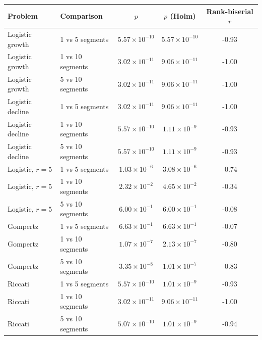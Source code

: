 \begin{tabular}{llccc}
\toprule
Problem & Comparison & $p$ & $p$ (Holm) & Rank-biserial $r$\\
\midrule
Logistic growth & 1 vs 5 segments & $5.57\times10^{-10}$ & $5.57\times10^{-10}$ & -0.93\\
Logistic growth & 1 vs 10 segments & $3.02\times10^{-11}$ & $9.06\times10^{-11}$ & -1.00\\
Logistic growth & 5 vs 10 segments & $3.02\times10^{-11}$ & $9.06\times10^{-11}$ & -1.00\\
Logistic decline & 1 vs 5 segments & $3.02\times10^{-11}$ & $9.06\times10^{-11}$ & -1.00\\
Logistic decline & 1 vs 10 segments & $5.57\times10^{-10}$ & $1.11\times10^{-9}$ & -0.93\\
Logistic decline & 5 vs 10 segments & $5.57\times10^{-10}$ & $1.11\times10^{-9}$ & -0.93\\
Logistic, $r=5$ & 1 vs 5 segments & $1.03\times10^{-6}$ & $3.08\times10^{-6}$ & -0.74\\
Logistic, $r=5$ & 1 vs 10 segments & $2.32\times10^{-2}$ & $4.65\times10^{-2}$ & -0.34\\
Logistic, $r=5$ & 5 vs 10 segments & $6.00\times10^{-1}$ & $6.00\times10^{-1}$ & -0.08\\
Gompertz & 1 vs 5 segments & $6.63\times10^{-1}$ & $6.63\times10^{-1}$ & -0.07\\
Gompertz & 1 vs 10 segments & $1.07\times10^{-7}$ & $2.13\times10^{-7}$ & -0.80\\
Gompertz & 5 vs 10 segments & $3.35\times10^{-8}$ & $1.01\times10^{-7}$ & -0.83\\
Riccati & 1 vs 5 segments & $5.57\times10^{-10}$ & $1.01\times10^{-9}$ & -0.93\\
Riccati & 1 vs 10 segments & $3.02\times10^{-11}$ & $9.06\times10^{-11}$ & -1.00\\
Riccati & 5 vs 10 segments & $5.07\times10^{-10}$ & $1.01\times10^{-9}$ & -0.94\\
\bottomrule
\end{tabular}